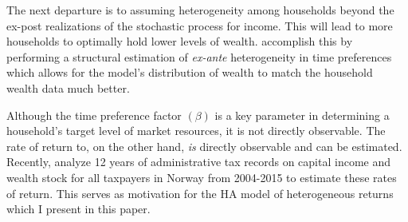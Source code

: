 \documentclass[\econtexRoot/Chp1proposal]{subfiles}
\begin{document}
\par The next departure is to assuming heterogeneity among households beyond the ex-post realizations of the stochastic process for income. This will lead to more households to optimally hold lower levels of wealth. \cite{cstw2017} accomplish this by performing a structural estimation of \textit{ex-ante} heterogeneity in time preferences which allows for the model's distribution of wealth to match the household wealth data much better. 



\par Although the time preference factor $(\beta)$ is a key parameter in determining a household's target level of market resources, it is not directly observable. The rate of return to, on the other hand, \textit{is} directly observable and can be estimated. Recently, \cite{aflgdmlp20} analyze 12 years of administrative tax records on capital income and wealth stock for all taxpayers in Norway from 2004-2015 to estimate these rates of return. This serves as motivation for the HA model of heterogeneous returns which I present in this paper.


\onlyinsubfile{}

\end{document}
